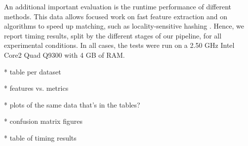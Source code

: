 

An additional important evaluation is the runtime performance of different methods.
This data allows focused work on fast feature extraction and on algorithms to speed up matching, such as locality-sensitive hashing \cite{Frome2004}.
Hence, we report timing results, split by the different stages of our pipeline, for all experimental conditions.
In all cases, the tests were run on a 2.50 GHz Intel Core2 Quad Q9300 with 4 GB of RAM.

* table per dataset

* features vs. metrics

* plots of the same data that's in the tables?

* confusion matrix figures

* table of timing results
